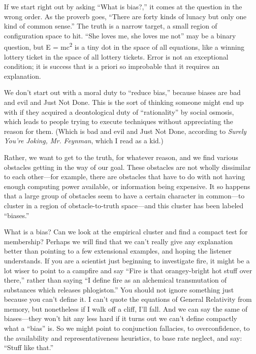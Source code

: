 {
 If we start right out by asking ``What is
bias?,'' it comes at the question in the wrong order.
As the proverb goes, ``There are forty kinds of lunacy
but only one kind of common sense.'' The truth is a
narrow target, a small region of configuration space to hit.
``She loves me, she loves me not''
may be a binary question, but E = mc\textsuperscript{2} is a tiny dot
in the space of all equations, like a winning lottery ticket in the
space of all lottery tickets. Error is not an exceptional condition; it
is success that is a priori so improbable that it requires an
explanation.}

{
 We don't start out with a moral duty to
``reduce bias,'' because biases are
bad and evil and Just Not Done. This is the sort of thinking someone
might end up with if they acquired a deontological duty of
``rationality'' by social osmosis,
which leads to people trying to execute techniques without appreciating
the reason for them. (Which is bad and evil and Just Not Done,
according to \textit{Surely You're Joking, Mr.
Feynman}, which I read as a kid.)}

{
 Rather, we want to get to the truth, for whatever reason, and we
find various obstacles getting in the way of our goal. These obstacles
are not wholly dissimilar to each other---for example, there are
obstacles that have to do with not having enough computing power
available, or information being expensive. It so happens that a large
group of obstacles seem to have a certain character in common---to
cluster in a region of obstacle-to-truth space---and this cluster has
been labeled ``biases.''}

{
 What is a bias? Can we look at the empirical cluster and find a
compact test for membership? Perhaps we will find that we
can't really give any explanation better than pointing
to a few extensional examples, and hoping the listener understands. If
you are a scientist just beginning to investigate fire, it might be a
lot wiser to point to a campfire and say ``Fire is
that orangey-bright hot stuff over there,'' rather
than saying ``I define fire as an alchemical
transmutation of substances which releases
phlogiston.'' You should not ignore something just
because you can't define it. I can't
quote the equations of General Relativity from memory, but nonetheless
if I walk off a cliff, I'll fall. And we can say the
same of biases---they won't hit any less hard if it
turns out we can't define compactly what a
``bias'' is. So we might point to
conjunction fallacies, to overconfidence, to the availability and
representativeness heuristics, to base rate neglect, and say:
``Stuff like that.''}

